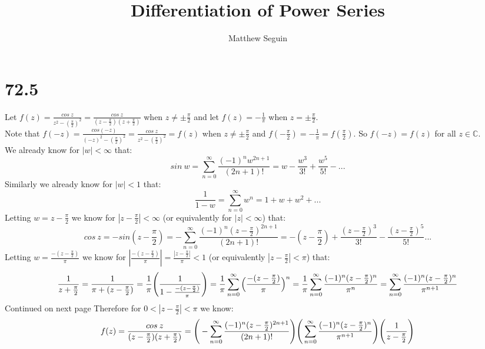 \documentclass{article}
\title{Differentiation of Power Series}
\author{Matthew Seguin}
\date{}
\begin{document}
\maketitle

\section*{72.5}
\begin{center}
    \doublespacing
    Let $f(z) =\frac{cos\:z}{z^2 -(\frac{\pi}{2})^2} =\frac{cos\:z}{(z -\frac{\pi}{2})(z +\frac{\pi}{2})}$ when $z\neq\pm\frac{\pi}{2}$ and let $f(z) = -\frac{1}{\pi}$ when $z =\pm\frac{\pi}{2}$.
    \\Note that $f(-z) =\frac{cos(-z)}{(-z)^2 - (\frac{\pi}{2})^2} =\frac{cos\:z}{z^2 - (\frac{\pi}{2})^2} = f(z)$ when $z\neq\pm\frac{\pi}{2}$ and $f(-\frac{\pi}{2}) = -\frac{1}{\pi} = f(\frac{\pi}{2})$. So $f(-z) = f(z)$ for all $z\in\mathbb{C}$.
    \\We already know for $|w| <\infty$ that:
    \[sin\:w =\sum _{n=0}^{\infty}\frac{(-1)^n w^{2n + 1}}{(2n + 1)!} = w -\frac{w^3}{3!} +\frac{w^5}{5!} - ...\]
    Similarly we already know for $|w| < 1$ that:
    \[\frac{1}{1 - w} =\sum _{n=0}^{\infty} w^n = 1 + w + w^2 + ...\]
    \break
    Letting $w = z -\frac{\pi}{2}$ we know for $|z -\frac{\pi}{2}| <\infty$ (or equivalently for $|z| <\infty$) that:
    \[cos\:z = -sin(z -\frac{\pi}{2}) = -\sum _{n=0}^{\infty}\frac{(-1)^n (z -\frac{\pi}{2})^{2n+1}}{(2n+1)!} = -(z -\frac{\pi}{2}) +\frac{(z -\frac{\pi}{2})^3}{3!} -\frac{(z -\frac{\pi}{2})^5}{5!} ...\]
    Letting $w =\frac{-(z -\frac{\pi}{2})}{\pi}$ we know for $|\frac{-(z -\frac{\pi}{2})}{\pi}| =\frac{|z -\frac{\pi}{2}|}{\pi} < 1$ (or equivalently $|z -\frac{\pi}{2}| <\pi$) that:
    \[\frac{1}{z +\frac{\pi}{2}} =\frac{1}{\pi + (z -\frac{\pi}{2})} =\frac{1}{\pi}\Bigg{(}\frac{1}{1 -\frac{-(z -\frac{\pi}{2})}{\pi}}\Bigg{)} =\frac{1}{\pi}\sum _{n=0}^{\infty}\Big{(}\frac{-(z -\frac{\pi}{2})}{\pi}\Big{)}^n =\frac{1}{\pi}\sum _{n=0}^{\infty}\frac{(-1)^n (z -\frac{\pi}{2})^n}{\pi ^n} =\sum _{n=0}^{\infty}\frac{(-1)^n (z -\frac{\pi}{2})^n}{\pi ^{n+1}}\]
    \break
    \newline\newline\newline\newline
    Continued on next page
    \newpage
    Therefore for $0 < |z -\frac{\pi}{2}| <\pi$ we know:
    \[f(z) =\frac{cos\:z}{(z -\frac{\pi}{2})(z +\frac{\pi}{2})} =\Bigg{(}-\sum _{n=0}^{\infty}\frac{(-1)^n (z -\frac{\pi}{2})^{2n+1}}{(2n+1)!}\Bigg{)}\Bigg{(}\sum _{n=0}^{\infty}\frac{(-1)^n (z -\frac{\pi}{2})^n}{\pi ^{n+1}}\Bigg{)}\Bigg{(}\frac{1}{z -\frac{\pi}{2}}\Bigg{)}\]

\end{center}
\end{document}
